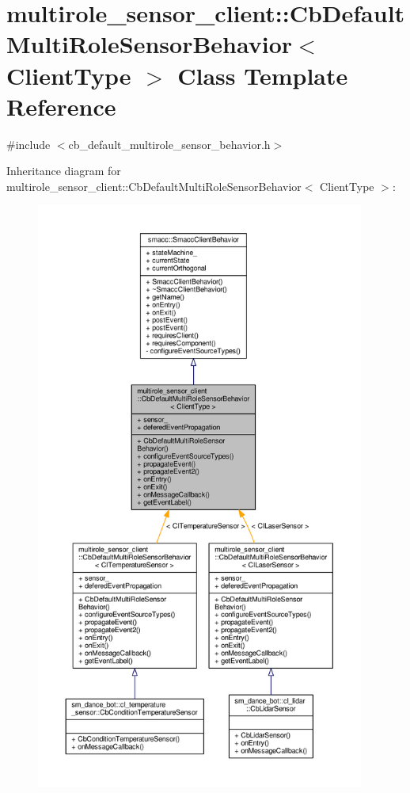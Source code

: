 \hypertarget{classmultirole__sensor__client_1_1CbDefaultMultiRoleSensorBehavior}{}\section{multirole\+\_\+sensor\+\_\+client\+:\+:Cb\+Default\+Multi\+Role\+Sensor\+Behavior$<$ Client\+Type $>$ Class Template Reference}
\label{classmultirole__sensor__client_1_1CbDefaultMultiRoleSensorBehavior}


{\ttfamily \#include $<$cb\+\_\+default\+\_\+multirole\+\_\+sensor\+\_\+behavior.\+h$>$}



Inheritance diagram for multirole\+\_\+sensor\+\_\+client\+:\+:Cb\+Default\+Multi\+Role\+Sensor\+Behavior$<$ Client\+Type $>$\+:\nopagebreak
\begin{figure}[H]
\begin{center}
\leavevmode
\includegraphics[height=550pt]{classmultirole__sensor__client_1_1CbDefaultMultiRoleSensorBehavior__inherit__graph}
\end{center}
\end{figure}


